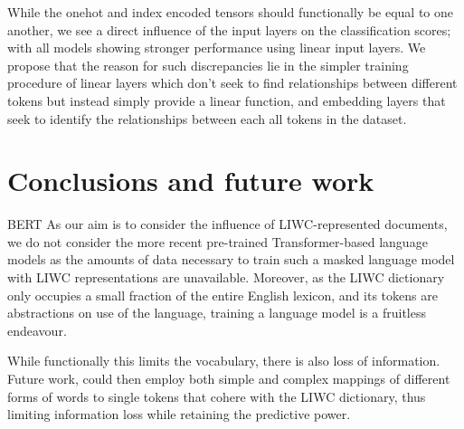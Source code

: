 
While the onehot and index encoded tensors should functionally be equal to one another, we see a direct influence of the input layers on the classification scores; with all models showing stronger performance using linear input layers. We propose that the reason for such discrepancies lie in the simpler training procedure of linear layers which don't seek to find relationships between different tokens but instead simply provide a linear function, and embedding layers that seek to identify the relationships between each all tokens in the dataset.

\section{Conclusions and future work}

BERT \cite{Koufakou,Vidgen,Tran:2020,Isaksen:2020}
As our aim is to consider the influence of LIWC-represented documents, we do not consider the more recent pre-trained Transformer-based language models \citep[e.g.]{Devlin:2019,Liu:2019} as the amounts of data necessary to train such a masked language model with LIWC representations are unavailable. Moreover, as the LIWC dictionary only occupies a small fraction of the entire English lexicon, and its tokens are abstractions on use of the language, training a language model is a fruitless endeavour.


While functionally this limits the vocabulary, there is also loss of information. Future work, could then employ both simple and complex mappings of different forms of words to single tokens that cohere with the LIWC dictionary, thus limiting information loss while retaining the predictive power.

